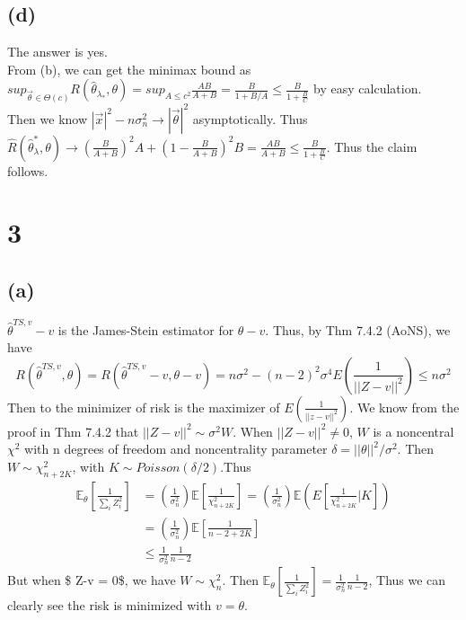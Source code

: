 \documentclass[]{article}
\begin{document}
\subsection{(d)}\label{d}

The answer is yes.\\
From (b), we can get the minimax bound as
\(sup_{\vec{\theta} \in \Theta(c)} R(\hat{\theta}_{\lambda_*},\theta) = sup_{A \leq c^2} \frac{AB}{A+B} = \frac{B}{1+B/A} \leq \frac{B}{1+\frac{B}{C}}\)
by easy calculation.\\
Then we know \(|\vec{x}|^2 - n\sigma_n^2 \rightarrow |\vec{\theta}|^2\)
asymptotically. Thus
\(\hat{R}(\hat{\theta}_\lambda^*, \theta) \rightarrow (\frac{B}{A+B})^2A + (1-\frac{B}{A+B})^2B = \frac{AB}{A+B} \leq \frac{B}{1+\frac{B}{C}}\).
Thus the claim follows.

\section{3}\label{section}

\subsection{(a)}\label{a}

\(\hat{\theta}^{TS,v} - v\) is the James-Stein estimator for
\(\theta - v\). Thus, by Thm 7.4.2 (AoNS), we have
\[ R(\hat{\theta}^{TS,v},\theta) = R(\hat{\theta}^{TS,v}-v, \theta - v) = n\sigma^2 - (n-2)^2 \sigma^4E(\frac{1}{||Z-v||^2})  \leq n\sigma^2   \]
Then to the minimizer of risk is the maximizer of
\(E(\frac{1}{||z-v||^2})\). We know from the proof in Thm 7.4.2 that
\(||Z-v||^2 \sim \sigma^2 W\). When \(||Z-v||^2 \neq 0\), \(W\) is a
noncentral \(\chi^2\) with n degrees of freedom and noncentrality
parameter \(\delta = ||\theta||^2/\sigma^2\). Then
\(W \sim \chi^{2}_{n+2K}\), with \(K \sim Poisson(\delta/2)\).Thus
\[ \begin{aligned} \mathbb{E}_{\theta} \left[\frac{1} {\sum_{i}Z_{i}^{2}} \right] & = \left(\frac{1} {\sigma_{n}^{2}} \right) \mathbb{E} \left[\frac{1}{\chi_{n + 2K}^{2}} \right] = \left(\frac{1}{\sigma_{n}^{2}}\right) \mathbb{ E }\left(E \left[\frac{1}{\chi_{n + 2K}^{2}}|K\right]\right) \\ & = \left(\frac{1}{\sigma_{n}^{2}} \right) \mathbb{E} \left[\frac{1}{n - 2 + 2 K} \right]\\  & \leq \frac{1} {\sigma_{n}^{2}} \frac{1}{n-2} \end{aligned}  \]
But when \$ \textbar{}\textbar{}Z-v\textbar{}\textbar{} = 0\$, we have
\(W \sim \chi^2_{n}\). Then
\(\mathbb{E}_{\theta} \left[\frac{1}{\sum_{i}Z_{i}^{2}} \right] = \frac{1} {\sigma_{n}^{2}} \frac{1}{n-2}\),
Thus we can clearly see the risk is minimized with \(v = \theta\).
\end{document}
